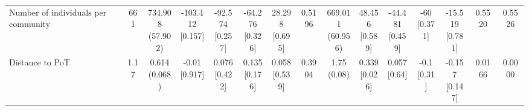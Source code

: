 {\begin{tabular}[t]{lcccccccccccccc}
\hspace{1em}Number of individuals per community & 661 & \makecell[c]{734.908\\(57.902)} & \makecell[c]{-103.412\\{[0.157]}} & \makecell[c]{-92.574\\{[0.257]}} & \makecell[c]{-64.276\\{[0.326]}} & \makecell[c]{28.298\\{[0.695]}} & 0.5196 & \makecell[c]{669.011\\(60.956)} & \makecell[c]{48.456\\{[0.589]}} & \makecell[c]{-44.481\\{[0.459]}} & \makecell[c]{-60\\{[0.371]}} & \makecell[c]{-15.519\\{[0.781]}} & 0.5520 & 0.5526\\
\hspace{1em}Distance to PoT & 1.17 & \makecell[c]{0.614\\(0.068)} & \makecell[c]{-0.01\\{[0.917]}} & \makecell[c]{0.076\\{[0.422]}} & \makecell[c]{0.135\\{[0.176]}} & \makecell[c]{0.058\\{[0.539]}} & 0.3904 & \makecell[c]{1.75\\(0.08)} & \makecell[c]{0.339\\{[0.026]}} & \makecell[c]{0.057\\{[0.64]}} & \makecell[c]{-0.1\\{[0.31]}} & \makecell[c]{-0.157\\{[0.147]}} & 0.0166 & 0.0000\\
\bottomrule
\end{tabular}}

